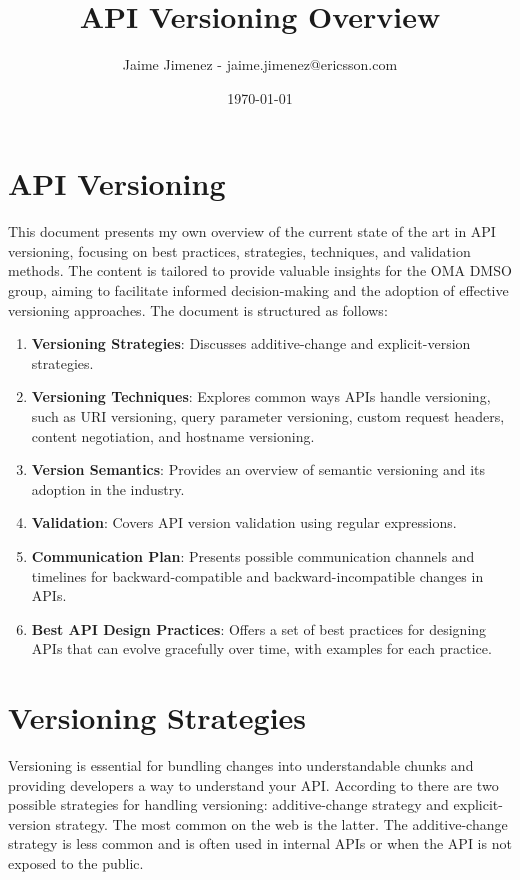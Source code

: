 \documentclass{article}
\title{API Versioning Overview}
\author{Jaime Jimenez - jaime.jimenez@ericsson.com}
\date{\today}
\begin{document}
\maketitle
\tableofcontents
\newpage

\section{API Versioning}

This document presents my own overview of the current state of the art in API versioning, focusing on best practices, strategies, techniques, and validation methods. The content is tailored to provide valuable insights for the OMA DMSO group, aiming to facilitate informed decision-making and the adoption of effective versioning approaches. The document is structured as follows:

\begin{enumerate}
    \item \textbf{Versioning Strategies}: Discusses additive-change and explicit-version strategies.
    \item \textbf{Versioning Techniques}: Explores common ways APIs handle versioning, such as URI versioning, query parameter versioning, custom request headers, content negotiation, and hostname versioning.
    \item \textbf{Version Semantics}: Provides an overview of semantic versioning and its adoption in the industry.
    \item \textbf{Validation}: Covers API version validation using regular expressions.
    \item \textbf{Communication Plan}: Presents possible communication channels and timelines for backward-compatible and backward-incompatible changes in APIs.
    \item \textbf{Best API Design Practices}: Offers a set of best practices for designing APIs that can evolve gracefully over time, with examples for each practice.
\end{enumerate}

\section{Versioning Strategies}

Versioning is essential for bundling changes into understandable chunks and providing developers a way to understand your API. According to \cite{DesigningWebAPIs} there are two possible strategies for handling versioning: additive-change strategy and explicit-version strategy. The most common on the web is the latter. The additive-change strategy is less common and is often used in internal APIs or when the API is not exposed to the public.
\end{document}
